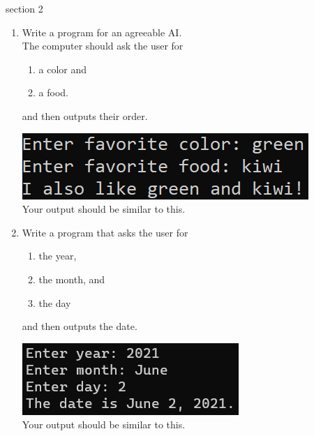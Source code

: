 \documentclass{article}
\begin{document}
section 2\\
\begin{enumerate}
	\item 
		Write a program for an agreeable AI.\\
		The computer should ask the user for \\
		\begin{minipage}{0.5\textwidth}
		\vspace*{-0.5em}
			\begin{enumerate}  \setlength\itemsep{-0.3em}
				\item a color and
				\item a food.  
			\end{enumerate} \vspace*{-1ex}
		and then outputs their order.
		\end{minipage}
		\begin{minipage}{0.5\textwidth}
			\centering
			\includegraphics[scale=0.75]{./imgs/agreeableAIoutput.png}\\
			Your output should be similar to this.
		\end{minipage}


	\item Write a program that asks the user for \\
		\begin{minipage}{0.5\textwidth}	
		\vspace*{-0.5em}
			\begin{enumerate}  \setlength\itemsep{-0.3em}
				\item the year,
				\item the month, and
				\item the day	
			\end{enumerate} \vspace*{-1ex}
		and then outputs the date.
		\end{minipage}
		\begin{minipage}{0.5\textwidth}
			\centering
			\includegraphics[scale=0.75]{./imgs/dateOutput.png}\\
			Your output should be similar to this.
		\end{minipage}


\end{enumerate}
\end{document}
